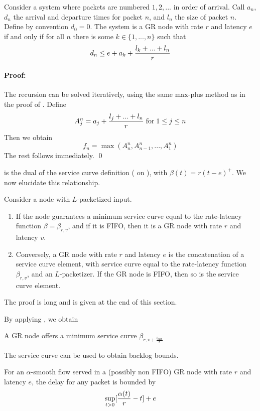 \begin{theorem}
  Consider a system where
packets are numbered $1, 2, ...$ in order of arrival. Call $a_n$,
$d_n$ the arrival and departure times for packet $n$, and $l_n$
the size of packet $n$. Define by convention $d_0=0$. The system
is a GR node with rate $r$ and latency $e$ if and only if for all
$n$ there is some $k \in \{1, ..., n\} $ such that
\begin{equation}\mylabel{eq-gr2091}\mylabel{eq-grmaxplus}
 d_n \leq e + a_k + \frac{l_k + ... + l_n}{r}
\end{equation}
\end{theorem}
\paragraph{Proof: } The recursion  can be solved
iteratively, using the same max-plus method as in the proof of
. Define
$$
 A^n_j=a_j +  \frac{l_j + ... + l_n}{r} \mathrm{\; for \; } 1 \leq j\leq n\\
$$
Then we obtain
 $$
 f_n  = \max(A_n^n , A_{n-1}^n , ... ,
    A_1^n)$$
The rest follows immediately. \qed

 is the dual of the service curve definition
( on ), with
$\beta(t)=r(t-e)^+$. We now elucidate this relationship.

\begin{theorem}
Consider a node with $L$-packetized input.
\begin{enumerate}
  \item If the node guarantees a minimum service curve equal to
  the rate-latency function
$\beta=\beta_{r,v}$, and if it is FIFO, then it is a GR node with
rate $r$ and latency $v$.
  \item Conversely, a GR node with rate $r$ and latency $e$
is the concatenation of a service curve element, with service
curve equal to the rate-latency function $\beta_{r,v}$, and an
$L$-packetizer. If the GR node is FIFO, then so is the service
curve element.
\end{enumerate}
\end{theorem}
The proof is long and is given at the end of this section.

By applying , we obtain
\begin{corollary}
A GR node offers a minimum service curve $\beta_{r, v+
\frac{l_{\max}}{r}}$ 
\end{corollary}
The service curve can be used to obtain backlog bounds.
\begin{theorem}
For an $\alpha$-smooth flow served in
a (possibly non FIFO) GR node with rate $r$ and latency $e$, the
delay for any packet is bounded by
\begin{equation}\mylabel{eq-psrgnf1}\mylabel{eq-mpdel}
  \sup_{t > 0} [\frac{\alpha(t)}{r} -  t] + e
\end{equation}
\end{theorem}
